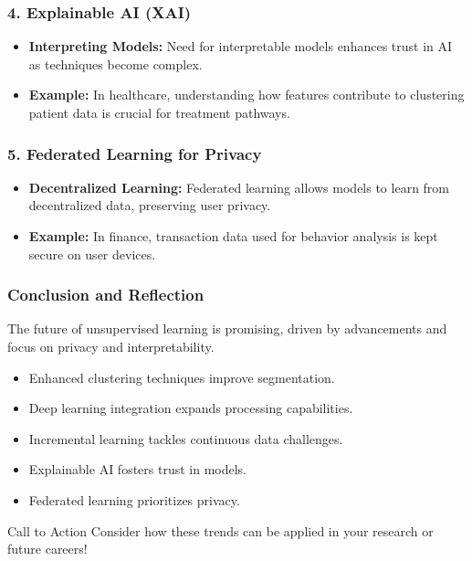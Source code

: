 \documentclass[aspectratio=169]{beamer}
\begin{document}
\begin{frame}[fragile]
    \frametitle{4. Explainable AI (XAI)}
    \begin{itemize}
        \item \textbf{Interpreting Models:} 
        Need for interpretable models enhances trust in AI as techniques become complex.
        
        \item \textbf{Example:} 
        In healthcare, understanding how features contribute to clustering patient data is crucial for treatment pathways.
    \end{itemize}
\end{frame}

\begin{frame}[fragile]
    \frametitle{5. Federated Learning for Privacy}
    \begin{itemize}
        \item \textbf{Decentralized Learning:} 
        Federated learning allows models to learn from decentralized data, preserving user privacy.
        
        \item \textbf{Example:} 
        In finance, transaction data used for behavior analysis is kept secure on user devices.
    \end{itemize}
\end{frame}

\begin{frame}[fragile]
    \frametitle{Conclusion and Reflection}
    The future of unsupervised learning is promising, driven by advancements and focus on privacy and interpretability.
    \begin{itemize}
        \item Enhanced clustering techniques improve segmentation.
        \item Deep learning integration expands processing capabilities.
        \item Incremental learning tackles continuous data challenges.
        \item Explainable AI fosters trust in models.
        \item Federated learning prioritizes privacy.
    \end{itemize}
    \begin{block}{Call to Action}
        Consider how these trends can be applied in your research or future careers!
    \end{block}
\end{frame}
\end{document}
